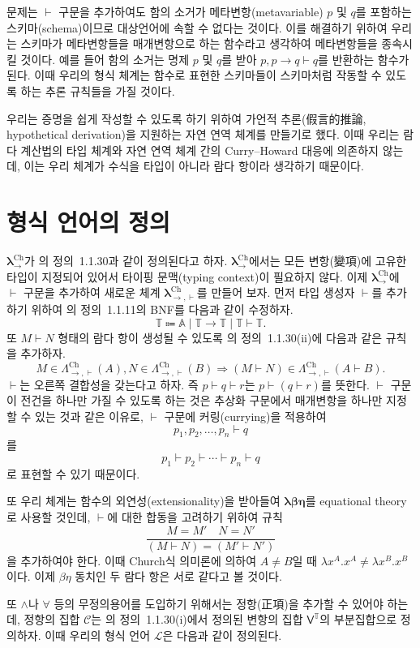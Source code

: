 \documentclass[10pt,twocolumn]{article}
\theoremstyle{definition}
\newcommand{\lch}{\bm\lambda_\to^{\text{Ch}}}
\newcommand{\lchh}{\bm\lambda_{\to,\vdash}^{\text{Ch}}}
\newcommand{\Lchh}{\Lambda_{\to,\vdash}^{\text{Ch}}}
\begin{document}
문제는 $\vdash$ 구문을 추가하여도 함의 소거가 메타변항(metavariable) $p$ 및 $q$를 포함하는 스키마(schema)이므로 대상언어에 속할 수 없다는 것이다. 이를 해결하기 위하여 우리는 스키마가 메타변항들을 매개변항으로 하는 함수라고 생각하여 메타변항들을 종속시킬 것이다. 예를 들어 함의 소거는 명제 $p$ 및 $q$를 받아 $p, p\to q\vdash q$를 반환하는 함수가 된다. 이때 우리의 형식 체계는 함수로 표현한 스키마들이 스키마처럼 작동할 수 있도록 하는 추론 규칙들을 가질 것이다.

우리는 증명을 쉽게 작성할 수 있도록 하기 위하여 가언적 추론(假言的推論, hypothetical derivation)을 지원하는 자연 연역 체계를 만들기로 했다. 이때 우리는 람다 계산법의 타입 체계와 자연 연역 체계 간의 Curry--Howard 대응\cite{howard}에 의존하지 않는데, 이는 우리 체계가 수식을 타입이 아니라 람다 항이라 생각하기 때문이다. 

\section{형식 언어의 정의}

$\lch$가 \cite{luswt}의 정의~1.1.30과 같이 정의된다고 하자. $\lch$에서는 모든 변항(變項)에 고유한 타입이 지정되어 있어서 타이핑 문맥(typing context)이 필요하지 않다. 이제 $\lch$에 $\vdash$ 구문을 추가하여 새로운 체계 $\lchh$를 만들어 보자. 먼저 타입 생성자 $\vdash$를 추가하기 위하여 \cite{luswt}의 정의~1.1.11의 BNF를 다음과 같이 수정하자.
$$\mathds T \Coloneqq \mathbb A\mid\mathds T\to\mathds T\mid\mathds T\vdash\mathds T.$$
또 $M\vdash N$ 형태의 람다 항이 생성될 수 있도록 \cite{luswt}의 정의~1.1.30(ii)에 다음과 같은 규칙을 추가하자.
$$M\in\Lchh(A), N\in\Lchh(B)\Rightarrow (M\vdash N)\in\Lchh(A\vdash B).$$
$\vdash$는 오른쪽 결합성을 갖는다고 하자. 즉 $p\vdash q\vdash r$는 $p\vdash (q\vdash r)$를 뜻한다. $\vdash$ 구문이 전건을 하나만 가질 수 있도록 하는 것은 추상화 구문에서 매개변항을 하나만 지정할 수 있는 것과 같은 이유로, $\vdash$ 구문에 커링(currying)을 적용하여
$$p_1, p_2, \ldots, p_n\vdash q$$
를
$$p_1 \vdash p_2\vdash\cdots\vdash p_n\vdash q$$
로 표현할 수 있기 때문이다.

또 우리 체계는 함수의 외연성(extensionality)을 받아들여 $\bm{\lambda\beta\eta}$를 equational theory로 사용할 것인데, $\vdash$에 대한 합동을 고려하기 위하여 규칙
$$\dfrac{M=M'\quad N=N'}{(M\vdash N)=(M'\vdash N')}$$
을 추가하여야 한다. 이때 Church식 의미론에 의하여 $A\ne B$일 때 $\lambda x^A.x^A\ne\lambda x^B.x^B$이다. 이제 $\beta\eta$ 동치인 두 람다 항은 서로 같다고 볼 것이다.

또 $\land$나 $\forall$ 등의 무정의용어를 도입하기 위해서는 정항(正項)을 추가할 수 있어야 하는데, 정항의 집합 $\mathcal C$는 \cite{luswt}의 정의~1.1.30(i)에서 정의된 변항의 집합 $\mathsf V^{\mathds T}$의 부분집합으로 정의하자. 이때 우리의 형식 언어 $\mathcal L$은 다음과 같이 정의된다.
\end{document}
